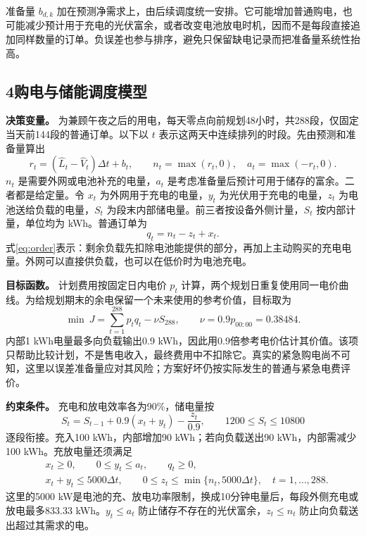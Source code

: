 \documentclass[11pt,a4paper]{article}
\begin{document}
准备量 $b_{d,k}$ 加在预测净需求上，由后续调度统一安排。它可能增加普通购电，也可能减少预计用于充电的光伏富余，或者改变电池放电时机，因而不是每段直接追加同样数量的订单。负误差也参与排序，避免只保留缺电记录而把准备量系统性抬高。

\subsection*{4\quad 购电与储能调度模型}

\textbf{决策变量。} 为兼顾午夜之后的用电，每天零点向前规划48小时，共288段，仅固定当天前144段的普通订单。以下以 $t$ 表示这两天中连续排列的时段。先由预测和准备量算出
\begin{equation}
r_t=(\widehat L_t-\widehat V_t)\Delta t+b_t,\qquad
n_t=\max(r_t,0),\quad a_t=\max(-r_t,0).
\end{equation}
$n_t$ 是需要外网或电池补充的电量，$a_t$ 是考虑准备量后预计可用于储存的富余。二者都是给定量。令 $x_t$ 为外网用于充电的电量，$y_t$ 为光伏用于充电的电量，$z_t$ 为电池送给负载的电量，$S_t$ 为段末内部储电量。前三者按设备外侧计量，$S_t$ 按内部计量，单位均为 kWh。普通订单为
\begin{equation}
q_t=n_t-z_t+x_t.
\label{eq:order}
\end{equation}
式\eqref{eq:order}表示：剩余负载先扣除电池能提供的部分，再加上主动购买的充电电量。外网可以直接供负载，也可以在低价时为电池充电。

\textbf{目标函数。} 计划费用按固定日内电价 $p_t$ 计算，两个规划日重复使用同一电价曲线。为给规划期末的余电保留一个未来使用的参考价值，目标取为
\begin{equation}
\min\ J=\sum_{t=1}^{288}p_tq_t-\nu S_{288},\qquad
\nu=0.9p_{00:00}=0.38484.
\label{eq:objective}
\end{equation}
内部1 kWh电量最多向负载输出0.9 kWh，因此用0.9倍参考电价估计其价值。该项只帮助比较计划，不是售电收入，最终费用中不扣除它。真实的紧急购电尚不可知，这里以误差准备量应对其风险；方案好坏仍按实际发生的普通与紧急电费评价。

\textbf{约束条件。} 充电和放电效率各为90\%，储电量按
\begin{equation}
S_t=S_{t-1}+0.9(x_t+y_t)-\frac{z_t}{0.9},\qquad
1200\le S_t\le10800
\label{eq:storage}
\end{equation}
逐段衔接。充入100 kWh，内部增加90 kWh；若向负载送出90 kWh，内部需减少100 kWh。充放电量还须满足
\begin{equation}
\begin{aligned}
&x_t\ge0,\qquad 0\le y_t\le a_t,\qquad q_t\ge0,\\
&x_t+y_t\le5000\Delta t,\qquad
0\le z_t\le\min\{n_t,5000\Delta t\},\quad t=1,\ldots,288.
\end{aligned}
\label{eq:bounds}
\end{equation}
这里的5000 kW是电池的充、放电功率限制，换成10分钟电量后，每段外侧充电或放电最多833.33 kWh。$y_t\le a_t$ 防止储存不存在的光伏富余，$z_t\le n_t$ 防止向负载送出超过其需求的电。
\end{document}
